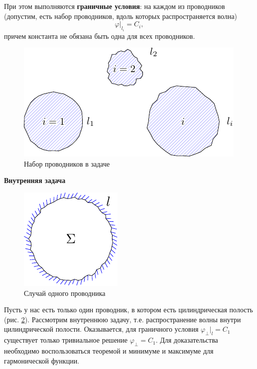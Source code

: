 \documentclass[a4paper,14pt]{extarticle}
\DeclareMathOperator{\Div}{div}
\begin{document}
При этом выполняются \textbf{граничные условия}: на каждом из проводников (допустим, есть набор проводников, вдоль которых распространяется волна)
\begin{equation*}
\varphi|_{l_i}=C_i,
\end{equation*}
причем константа не обязана быть одна для всех проводников.

\begin{figure}[h!]
	\centering
	\includegraphics[scale=1]{img/lect4_ris1}
	\caption{Набор проводников в задаче}
	\label{fig:lect4:1}
\end{figure}

\textbf{Внутренняя задача}

\begin{figure}[h!]
	\centering
	\includegraphics[scale=1]{img/lect4_ris2}
	\caption{Случай одного проводника}
	\label{fig:lect4:2}
\end{figure}
Пусть у нас есть только один проводник, в котором есть цилиндрическая полость (рис. \ref{fig:lect4:2}). Рассмотрим внутреннюю задачу, т.е. распространение волны внутри цилиндрической полости. Оказывается, для граничного условия $\varphi_\perp|_l=C_1$ существует только тривиальное решение $\varphi_\perp=C_1$. Для доказательства необходимо воспользоваться теоремой и минимуме и максимуме для гармонической функции.
\end{document}
